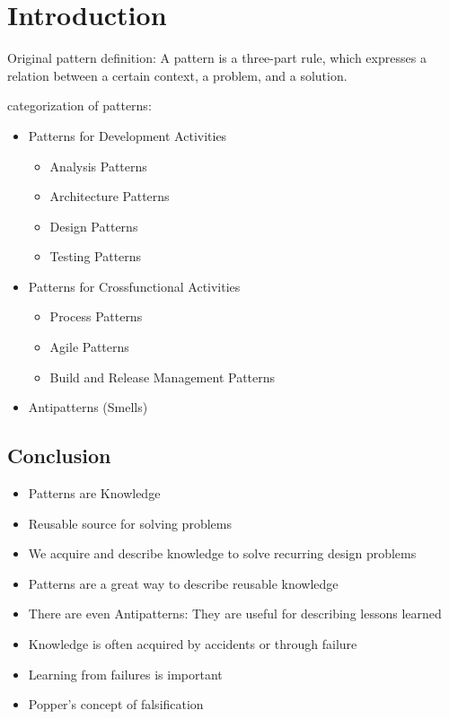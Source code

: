 
\section{Introduction}

Original pattern definition: A pattern is a three-part rule, which expresses a relation between a certain context, a problem, and a solution.

categorization of patterns:
\begin{itemize}
	\item Patterns for Development Activities
		\begin{itemize}
			\item Analysis Patterns
			\item Architecture Patterns
			\item Design Patterns
			\item Testing Patterns
		\end{itemize}
	\item Patterns for Crossfunctional Activities
		\begin{itemize}
			\item Process Patterns
			\item Agile Patterns
			\item Build and Release Management Patterns
		\end{itemize}
	\item Antipatterns (Smells)
\end{itemize}

\subsection{Conclusion}

\begin{itemize}
	\item  Patterns are Knowledge
	\item  Reusable source for solving problems
	\item  We acquire and describe knowledge to solve
	recurring design problems
	\item  Patterns are a great way to describe reusable
	knowledge
	\item  There are even Antipatterns: They are useful for
	describing lessons learned
	\item  Knowledge is often acquired by accidents or
	through failure
	\item  Learning from failures is important
	\item  Popper’s concept of falsification
\end{itemize}